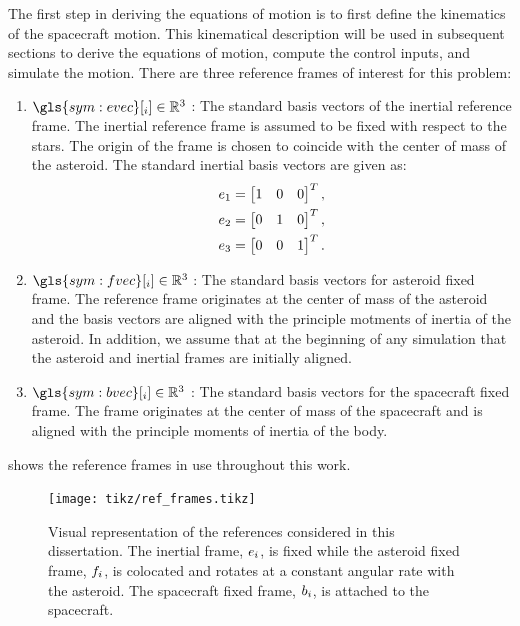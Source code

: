 The first step in deriving the equations of motion is to first define the \gls{kinematics} of the spacecraft motion.
This kinematical description will be used in subsequent sections to derive the equations of motion, compute the control inputs, and simulate the motion.
There are three reference frames of interest for this problem:
\begin{enumerate}
    \item \( \gls{sym:evec}[_i] \in \R^3 \) : The standard basis vectors of the inertial reference frame.
        The inertial reference frame is assumed to be fixed with respect to the stars. 
        The origin of the frame is chosen to coincide with the center of mass of the asteroid.
        The standard inertial basis vectors are given as:
        \begin{align*}
            e_{1} &= \begin{bmatrix} 1 & 0 & 0 \end{bmatrix}^T, \\
            e_{2} &= \begin{bmatrix} 0 & 1 & 0 \end{bmatrix}^T, \\
            e_{3} &= \begin{bmatrix} 0 & 0 & 1 \end{bmatrix}^T.
        \end{align*}
    \item \( \gls{sym:fvec}[_i] \in \R^3 \) : The standard basis vectors for asteroid fixed frame.
        The reference frame originates at the center of mass of the asteroid and the basis vectors are aligned with the principle motments of inertia of the asteroid.
        In addition, we assume that at the beginning of any simulation that the asteroid and inertial frames are initially aligned.
    \item \( \gls{sym:bvec}[_i] \in \R^3 \) : The standard basis vectors for the spacecraft fixed frame.
        The frame originates at the center of mass of the spacecraft and is aligned with the principle moments of inertia of the body.
\end{enumerate}
 shows the reference frames in use throughout this work.
\begin{figure}
    \centering
    \texttt{[image: tikz/ref\_frames.tikz]}
    \caption{Visual representation of the references considered in this dissertation.
    The inertial frame, \( e_i \), is fixed while the asteroid fixed frame, \( f_i \), is colocated and rotates at a constant angular rate with the asteroid.
The spacecraft fixed frame, \( b_i \), is attached to the spacecraft.\label{fig:reference_frames}}
\end{figure}

